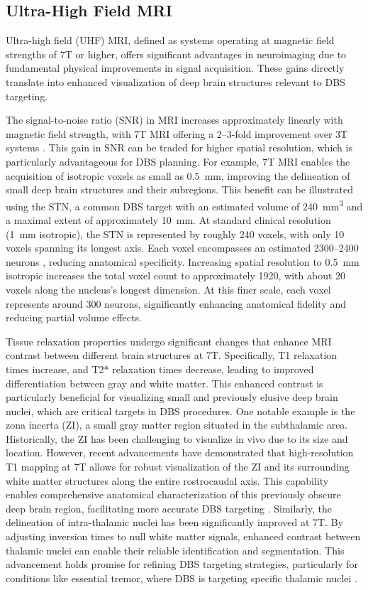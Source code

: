 \subsection{Ultra-High Field MRI}
\label{sec:uhf_mri_physics}

Ultra-high field (UHF) MRI, defined as systems operating at magnetic field strengths of 7T or higher, offers significant advantages in neuroimaging due to fundamental physical improvements in signal acquisition. These gains directly translate into enhanced visualization of deep brain structures relevant to DBS targeting.

The signal-to-noise ratio (SNR) in MRI increases approximately linearly with magnetic field strength, with 7T MRI offering a 2--3-fold improvement over 3T systems \cite{Trampel2019-fa}. This gain in SNR can be traded for higher spatial resolution, which is particularly advantageous for DBS planning. For example, 7T MRI enables the acquisition of isotropic voxels as small as 0.5~mm, improving the delineation of small deep brain structures and their subregions. This benefit can be illustrated using the STN, a common DBS target with an estimated volume of 240~mm\textsuperscript{3} and a maximal extent of approximately 10~mm. At standard clinical resolution (1~mm isotropic), the STN is represented by roughly 240 voxels, with only 10 voxels spanning its longest axis. Each voxel encompasses an estimated 2300--2400 neurons \cite{Hamani2004-zr,Hardman2002-ru}, reducing anatomical specificity. Increasing spatial resolution to 0.5~mm isotropic increases the total voxel count to approximately 1920, with about 20 voxels along the nucleus’s longest dimension. At this finer scale, each voxel represents around 300 neurons, significantly enhancing anatomical fidelity and reducing partial volume effects.

Tissue relaxation properties undergo significant changes that enhance MRI contrast between different brain structures at 7T. Specifically, T1 relaxation times increase, and T2* relaxation times decrease, leading to improved differentiation between gray and white matter. This enhanced contrast is particularly beneficial for visualizing small and previously elusive deep brain nuclei, which are critical targets in DBS procedures. One notable example is the zona incerta (ZI), a small gray matter region situated in the subthalamic area. Historically, the ZI has been challenging to visualize in vivo due to its size and location. However, recent advancements have demonstrated that high-resolution T1 mapping at 7T allows for robust visualization of the ZI and its surrounding white matter structures along the entire rostrocaudal axis. This capability enables comprehensive anatomical characterization of this previously obscure deep brain region, facilitating more accurate DBS targeting \cite{Lau2020-dh}. Similarly, the delineation of intra-thalamic nuclei has been significantly improved at 7T. By adjusting inversion times to null white matter signals, enhanced contrast between thalamic nuclei can enable their reliable identification and segmentation. This advancement holds promise for refining DBS targeting strategies, particularly for conditions like essential tremor, where DBS is targeting specific thalamic nuclei \cite{Tourdias2014-un}.

